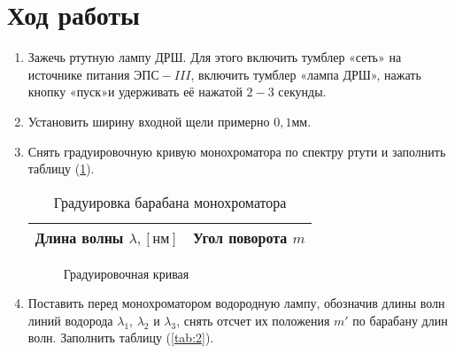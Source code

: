 \documentclass[12pt]{article}
\let\oldref\ref
\renewcommand{\ref}[1]{(\oldref{#1})}
\begin{document}
    \section*{Ход работы}
    \begin{enumerate}[wide, labelwidth=!, labelindent=0pt]
        \item Зажечь  ртутную  лампу  ДРШ.  Для  этого  включить  тумблер  «сеть»  на  источнике питания  $ ЭПС-III $,  включить  тумблер  «лампа  ДРШ», нажать  кнопку  «пуск»и  удерживать  её нажатой $ 2-3 $ секунды.
        \item Установить ширину  входной  щели  примерно  $ 0,1мм $.
        \item Снять градуировочную кривую монохроматора по спектру ртути и заполнить таблицу \ref{tab:1}.
        \begin{table}[h!]
            \caption{Градуировка барабана монохроматора}
            \label{tab:1}
            \centering
            \begin{tabular}{|c|c|}
                \hline
                Длина волны $\lambda, [нм]$ & Угол поворота $ m $  \\
                \hline                
            \end{tabular}
        \end{table}
        \begin{figure}[h!]
            \label{graph:1}
            \caption{Градуировочная кривая}
            \centering
        \end{figure}
        \item Поставить  перед  монохроматором  водородную лампу, обозначив длины волн линий водорода $ \lambda_1 $, $ \lambda_2 $ и $ \lambda_3 $, снять отсчет их положения  $ m' $ по барабану длин волн. Заполнить таблицу \ref{tab:2}.
        \begin{table}[h!]

\end{table}
\end{enumerate}
\end{document}
